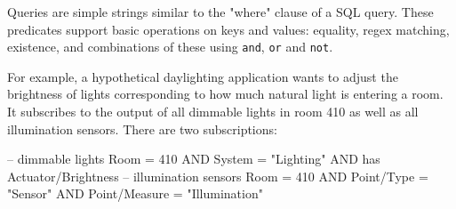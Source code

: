 

Queries are simple strings similar to the "where" clause of a SQL query. 
These predicates support basic operations on keys and values: equality, regex matching, existence, and combinations of these using \texttt{and}, \texttt{or} and \texttt{not}.

For example, a hypothetical daylighting application wants to adjust the brightness of lights corresponding to how much natural light is entering a room.
It subscribes to the output of all dimmable lights in room 410 as well as all illumination sensors.
There are two subscriptions:

\begin{minipage}{\linewidth}
\begin{textcode}
-- dimmable lights
Room = 410 AND System = "Lighting"
AND has Actuator/Brightness
-- illumination sensors
Room = 410 AND Point/Type = "Sensor"
AND Point/Measure = "Illumination"
\end{textcode}
\end{minipage}
\vspace{0.3cm}

